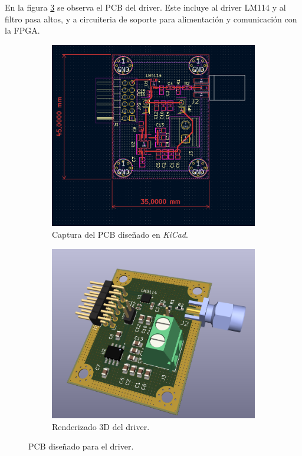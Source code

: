 En la figura \ref{fig:driver_pcb} se observa el PCB del driver. Este incluye al
driver LM114 y al filtro pasa altos, y a circuiteria de soporte para
alimentación y comunicación con la FPGA.

\begin{figure}[t!]
    \centering
    \begin{subfigure}[b]{0.45\textwidth}
        \includegraphics[width=\textwidth]{images/driver_pcb.png}
        \caption{Captura del PCB diseñado en \textit{KiCad}.}
        \label{fig:driver_layout}
    \end{subfigure}
    \hfill
    \begin{subfigure}[b]{0.45\textwidth}
        \includegraphics[width=\textwidth]{images/driver_3d_render.png}
        \caption{Renderizado 3D del driver.}
        \label{fig:driver_3d}
    \end{subfigure}

    \caption{PCB diseñado para el driver.}
    \label{fig:driver_pcb}
\end{figure}


